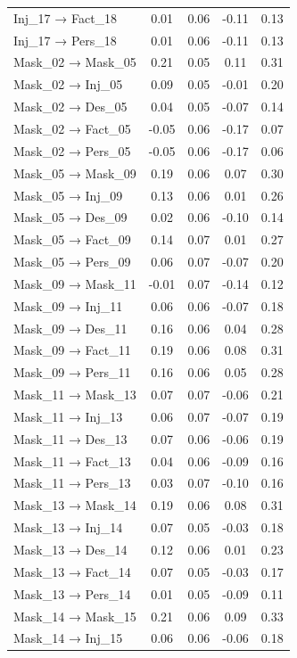 \documentclass[
  man, donotrepeattitle,floatsintext]{apa6}
\begin{document}
\begin{center}
\begin{ThreePartTable}
{\begin{longtable}{lcccc}
Inj\_17 → Fact\_18 & 0.01 & 0.06 & -0.11 & 0.13\\
Inj\_17 → Pers\_18 & 0.01 & 0.06 & -0.11 & 0.13\\
Mask\_02 → Mask\_05 & 0.21 & 0.05 & 0.11 & 0.31\\
Mask\_02 → Inj\_05 & 0.09 & 0.05 & -0.01 & 0.20\\
Mask\_02 → Des\_05 & 0.04 & 0.05 & -0.07 & 0.14\\
Mask\_02 → Fact\_05 & -0.05 & 0.06 & -0.17 & 0.07\\
Mask\_02 → Pers\_05 & -0.05 & 0.06 & -0.17 & 0.06\\
Mask\_05 → Mask\_09 & 0.19 & 0.06 & 0.07 & 0.30\\
Mask\_05 → Inj\_09 & 0.13 & 0.06 & 0.01 & 0.26\\
Mask\_05 → Des\_09 & 0.02 & 0.06 & -0.10 & 0.14\\
Mask\_05 → Fact\_09 & 0.14 & 0.07 & 0.01 & 0.27\\
Mask\_05 → Pers\_09 & 0.06 & 0.07 & -0.07 & 0.20\\
Mask\_09 → Mask\_11 & -0.01 & 0.07 & -0.14 & 0.12\\
Mask\_09 → Inj\_11 & 0.06 & 0.06 & -0.07 & 0.18\\
Mask\_09 → Des\_11 & 0.16 & 0.06 & 0.04 & 0.28\\
Mask\_09 → Fact\_11 & 0.19 & 0.06 & 0.08 & 0.31\\
Mask\_09 → Pers\_11 & 0.16 & 0.06 & 0.05 & 0.28\\
Mask\_11 → Mask\_13 & 0.07 & 0.07 & -0.06 & 0.21\\
Mask\_11 → Inj\_13 & 0.06 & 0.07 & -0.07 & 0.19\\
Mask\_11 → Des\_13 & 0.07 & 0.06 & -0.06 & 0.19\\
Mask\_11 → Fact\_13 & 0.04 & 0.06 & -0.09 & 0.16\\
Mask\_11 → Pers\_13 & 0.03 & 0.07 & -0.10 & 0.16\\
Mask\_13 → Mask\_14 & 0.19 & 0.06 & 0.08 & 0.31\\
Mask\_13 → Inj\_14 & 0.07 & 0.05 & -0.03 & 0.18\\
Mask\_13 → Des\_14 & 0.12 & 0.06 & 0.01 & 0.23\\
Mask\_13 → Fact\_14 & 0.07 & 0.05 & -0.03 & 0.17\\
Mask\_13 → Pers\_14 & 0.01 & 0.05 & -0.09 & 0.11\\
Mask\_14 → Mask\_15 & 0.21 & 0.06 & 0.09 & 0.33\\
Mask\_14 → Inj\_15 & 0.06 & 0.06 & -0.06 & 0.18\\

\end{longtable}}
\end{ThreePartTable}
\end{center}
\end{document}

